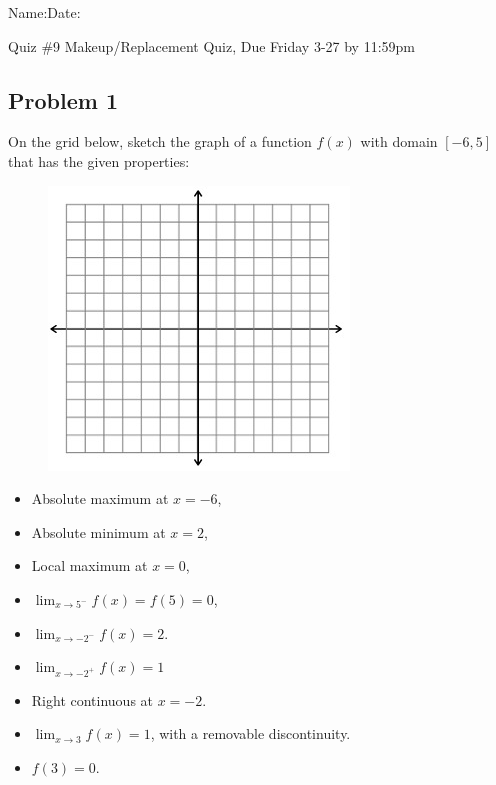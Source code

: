 \documentclass[10pt]{book}
\theoremstyle{definition}
\begin{document}
\begin{flushleft}
Name:\underline{\hspace{13cm}}Date:\underline{\hspace{2cm}}
\end{flushleft}
\begin{center}
{\Large \hspace{0.5cm} Quiz \#9 Makeup/Replacement Quiz, Due Friday 3-27 by 11:59pm}
\end{center}
\vspace{0.2 cm}
\subsection*{Problem 1} 
On the grid below, sketch the graph of a function $f(x)$ with domain $[-6,5]$ that has the given properties:
\\
\begin{figure}
\includegraphics[width=\linewidth]{blankgrid1.jpg} 
 \vspace{-110pt}
\end{figure}
\begin{itemize}
    \item Absolute maximum at $x=-6$,
    \item Absolute minimum at $x=2$,
    \item Local maximum at $x=0$,
    \item $\displaystyle\lim_{x\rightarrow 5^-}f(x)=f(5)=0$,
    \item $\displaystyle\lim_{x\rightarrow -2^-}f(x)=2$.
    \item $\displaystyle\lim_{x\rightarrow -2^+}f(x)=1$
    \item Right continuous at $x=-2$.
    \item $\displaystyle\lim_{x\rightarrow 3}f(x)=1$, with a removable discontinuity.
    \item $f(3)=0$.
\end{itemize}
\vspace{1cm}
\end{document}
